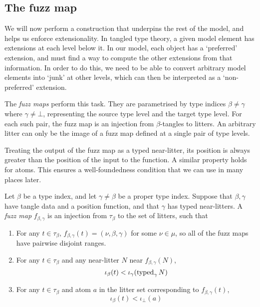 \subsection{The fuzz map}

We will now perform a construction that underpins the rest of the model, and helps us enforce extensionality.
In tangled type theory, a given model element has extensions at each level below it.
In our model, each object has a `preferred' extension, and must find a way to compute the other extensions from that information.
In order to do this, we need to be able to convert arbitrary model elements into `junk' at other levels, which can then be interpreted as a `non-preferred' extension.

The \emph{fuzz maps} perform this task.
They are parametrised by type indices \( \beta \neq \gamma \) where \( \gamma \neq \bot \), representing the source type level and the target type level.
For each such pair, the fuzz map is an injection from \( \beta \)-tangles to litters.
An arbitrary litter can only be the image of a fuzz map defined at a single pair of type levels.

Treating the output of the fuzz map as a typed near-litter, its position is always greater than the position of the input to the function.
A similar property holds for atoms.
This ensures a well-foundedness condition that we can use in many places later.

\begin{definition}
    \label{def:fuzz}
    Let \( \beta \) be a type index, and let \( \gamma \neq \beta \) be a proper type index.
    Suppose that \( \beta, \gamma \) have tangle data and a position function, and that \( \gamma \) has typed near-litters.
    A \emph{fuzz map} \( f_{\beta,\gamma} \) is an injection from \( \tau_\beta \) to the set of litters, such that
    \begin{enumerate}
        \item For any \( t \in \tau_\beta \), \( f_{\beta,\gamma}(t) = (\nu, \beta, \gamma) \) for some \( \nu \in \mu \), so all of the fuzz maps have pairwise disjoint ranges.
        \item For any \( t \in \tau_\beta \) and any near-litter \( N \) near \( f_{\beta,\gamma}(N) \),
        \[ \iota_\beta(t) < \iota_\gamma(\operatorname{typed}_\gamma N) \]
        \item For any \( t \in \tau_\beta \) and atom \( a \) in the litter set corresponding to \( f_{\beta,\gamma}(t) \),
        \[ \iota_\beta(t) < \iota_\bot(a) \]
    \end{enumerate}
\end{definition}

